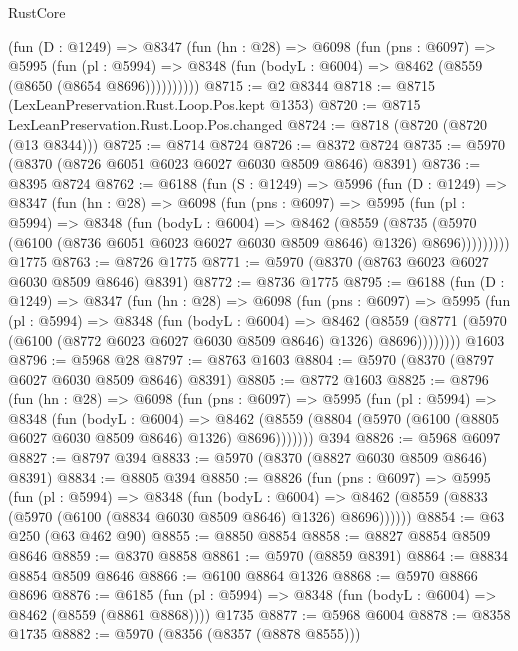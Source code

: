 \begin{lexlean}{RustCore}
\begin{coremodule}
        (fun (D : @1249) =>
        @8347
          (fun (hn : @28) =>
          @6098
            (fun (pns : @6097) =>
            @5995
              (fun (pl : @5994) =>
              @8348 (fun (bodyL : @6004) => @8462 (@8559 (@8650 (@8654 @8696))))))))))
@8715 := @2 @8344
@8718 := @8715 (LexLeanPreservation.Rust.Loop.Pos.kept @1353)
@8720 := @8715 LexLeanPreservation.Rust.Loop.Pos.changed
@8724 := @8718 (@8720 (@8720 (@13 @8344)))
@8725 := @8714 @8724
@8726 := @8372 @8724
@8735 := @5970 (@8370 (@8726 @6051 @6023 @6027 @6030 @8509 @8646) @8391)
@8736 := @8395 @8724
@8762 := @6188
    (fun (S : @1249) =>
    @5996
      (fun (D : @1249) =>
      @8347
        (fun (hn : @28) =>
        @6098
          (fun (pns : @6097) =>
          @5995
            (fun (pl : @5994) =>
            @8348
              (fun (bodyL : @6004) =>
              @8462
                (@8559
                  (@8735
                    (@5970 (@6100 (@8736 @6051 @6023 @6027 @6030 @8509 @8646) @1326) @8696)))))))))
    @1775
@8763 := @8726 @1775
@8771 := @5970 (@8370 (@8763 @6023 @6027 @6030 @8509 @8646) @8391)
@8772 := @8736 @1775
@8795 := @6188
    (fun (D : @1249) =>
    @8347
      (fun (hn : @28) =>
      @6098
        (fun (pns : @6097) =>
        @5995
          (fun (pl : @5994) =>
          @8348
            (fun (bodyL : @6004) =>
            @8462
              (@8559 (@8771 (@5970 (@6100 (@8772 @6023 @6027 @6030 @8509 @8646) @1326) @8696))))))))
    @1603
@8796 := @5968 @28
@8797 := @8763 @1603
@8804 := @5970 (@8370 (@8797 @6027 @6030 @8509 @8646) @8391)
@8805 := @8772 @1603
@8825 := @8796
    (fun (hn : @28) =>
    @6098
      (fun (pns : @6097) =>
      @5995
        (fun (pl : @5994) =>
        @8348
          (fun (bodyL : @6004) =>
          @8462 (@8559 (@8804 (@5970 (@6100 (@8805 @6027 @6030 @8509 @8646) @1326) @8696)))))))
    @394
@8826 := @5968 @6097
@8827 := @8797 @394
@8833 := @5970 (@8370 (@8827 @6030 @8509 @8646) @8391)
@8834 := @8805 @394
@8850 := @8826
    (fun (pns : @6097) =>
    @5995
      (fun (pl : @5994) =>
      @8348
        (fun (bodyL : @6004) =>
        @8462 (@8559 (@8833 (@5970 (@6100 (@8834 @6030 @8509 @8646) @1326) @8696))))))
@8854 := @63 @250 (@63 @462 @90)
@8855 := @8850 @8854
@8858 := @8827 @8854 @8509 @8646
@8859 := @8370 @8858
@8861 := @5970 (@8859 @8391)
@8864 := @8834 @8854 @8509 @8646
@8866 := @6100 @8864 @1326
@8868 := @5970 @8866 @8696
@8876 := @6185
    (fun (pl : @5994) => @8348 (fun (bodyL : @6004) => @8462 (@8559 (@8861 @8868))))
    @1735
@8877 := @5968 @6004
@8878 := @8358 @1735
@8882 := @5970 (@8356 (@8357 (@8878 @8555)))

\end{coremodule}
\end{lexlean}
